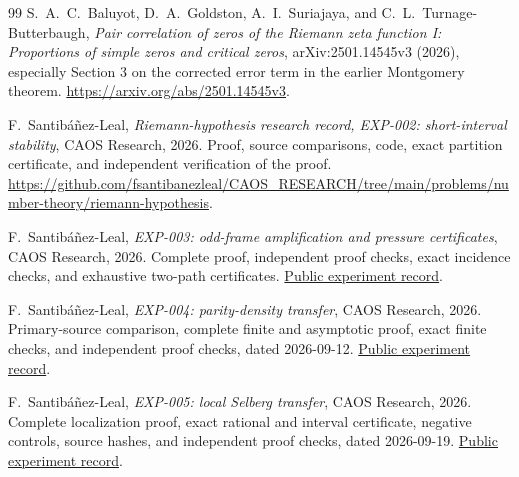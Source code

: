 \documentclass[11pt]{article}
\theoremstyle{remark}
\begin{document}
\begin{thebibliography}{99}
S.~A.~C.~Baluyot, D.~A.~Goldston, A.~I.~Suriajaya, and C.~L.~Turnage-Butterbaugh,
\emph{Pair correlation of zeros of the Riemann zeta function I:
Proportions of simple zeros and critical zeros},
arXiv:2501.14545v3 (2026), especially Section 3 on the
corrected error term in the earlier Montgomery theorem.
\url{https://arxiv.org/abs/2501.14545v3}.

F.~Santib\'a\~nez-Leal,
\emph{Riemann-hypothesis research record, EXP-002: short-interval
stability}, CAOS Research, 2026. Proof, source comparisons, code, exact
partition certificate, and independent verification of the proof.
\url{https://github.com/fsantibanezleal/CAOS_RESEARCH/tree/main/problems/number-theory/riemann-hypothesis}.

F.~Santib\'a\~nez-Leal,
\emph{EXP-003: odd-frame amplification and pressure certificates},
CAOS Research, 2026. Complete proof, independent proof checks, exact
incidence checks, and exhaustive two-path certificates.
\href{https://github.com/fsantibanezleal/CAOS_RESEARCH/tree/main/problems/number-theory/riemann-hypothesis/experiments/EXP-003-odd-frame-pressure}{Public experiment record}.

F.~Santib\'a\~nez-Leal,
\emph{EXP-004: parity-density transfer}, CAOS Research, 2026.
Primary-source comparison, complete finite and asymptotic proof, exact
finite checks, and independent proof checks, dated 2026-09-12.
\href{https://github.com/fsantibanezleal/CAOS_RESEARCH/tree/main/problems/number-theory/riemann-hypothesis/experiments/EXP-004-parity-density-transfer}{Public experiment record}.

F.~Santib\'a\~nez-Leal,
\emph{EXP-005: local Selberg transfer}, CAOS Research, 2026.
Complete localization proof, exact rational and interval certificate,
negative controls, source hashes, and independent proof checks, dated
2026-09-19.
\href{https://github.com/fsantibanezleal/CAOS_RESEARCH/tree/main/problems/number-theory/riemann-hypothesis/experiments/EXP-005-local-selberg-transfer}{Public experiment record}.

\end{thebibliography}
\end{document}
